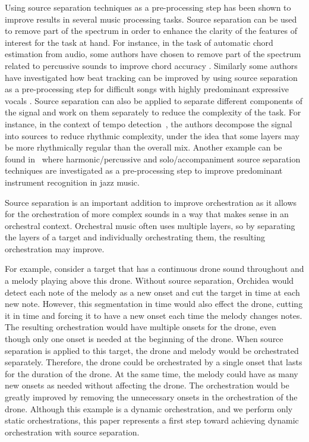 \documentclass{article}
\begin{document}
  Using source separation techniques as a pre-processing step has been shown to improve results in several music processing tasks. Source separation can be used to remove part of the spectrum in order to enhance the clarity of the features of interest for the task at hand. For instance, in the task of automatic chord estimation from audio, some authors have chosen to remove part of the spectrum related to percussive sounds to improve chord accuracy \cite{Reed_al2009}. Similarly some authors have investigated how beat tracking can be improved by using source separation as a pre-processing step for difficult songs with highly predominant expressive vocals \cite{ZapGom2012}. Source separation can also be applied to separate different components of the signal and work on them separately to reduce the complexity of the task. For instance, in the context of tempo detection~\cite{ChoRae2009}, the authors decompose the signal into sources to reduce rhythmic complexity, under the idea that some layers may be more rhythmically regular than the overall mix. Another example can be found in~\cite{GomAbecan2018} where harmonic/percussive and solo/accompaniment source separation techniques are investigated as a pre-processing step to improve predominant instrument recognition in jazz music.
    
  Source separation is an important addition to improve orchestration as it allows for the orchestration of more complex sounds in a way that makes sense in an orchestral context. Orchestral music often uses multiple layers, so by separating the layers of a target and individually orchestrating them, the resulting orchestration may improve. 
    
  For example, consider a target that has a continuous drone sound throughout and a melody playing above this drone. Without source separation, Orchidea would detect each note of the melody as a new onset and cut the target in time at each new note. However, this segmentation in time would also effect the drone, cutting it in time and forcing it to have a new onset each time the melody changes notes. The resulting orchestration would have multiple onsets for the drone, even though only one onset is needed at the beginning of the drone. When source separation is applied to this target, the drone and melody would be orchestrated separately. Therefore, the drone could be orchestrated by a single onset that lasts for the duration of the drone. At the same time, the melody could have as many new onsets as needed without affecting the drone. The orchestration would be greatly improved by removing the unnecessary onsets in the orchestration of the drone. Although this example is a dynamic orchestration, and we perform only static orchestrations, this paper represents a first step toward achieving dynamic orchestration with source separation.
    
\end{document}

